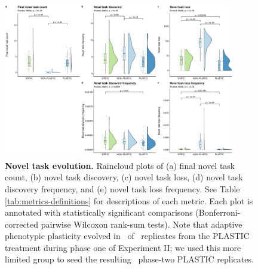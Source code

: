 \begin{figure}[h!]
    \centering
    \includegraphics[width=0.9\textwidth]{media/complex-traits-panel.pdf}
    \caption{\small
    \textbf{Novel task evolution.}
    Raincloud plots of 
    (a) final novel task count,
    (b) novel task discovery,
    (c) novel task loss,
    (d) novel task discovery frequency,
    and (e) novel task loss frequency.
    See Table \ref{tab:metrics-definitions} for descriptions of each metric.
    Each plot is annotated with statistically significant comparisons (Bonferroni-corrected pairwise Wilcoxon rank-sum tests).
    Note that adaptive phenotypic plasticity evolved in \novelTraitsPlasticReps\ of \novelTraitsReplicates\ replicates from the PLASTIC treatment during phase one of Experiment II; we used this more limited group to seed the resulting \novelTraitsPlasticReps\ phase-two PLASTIC replicates.
    }
    \label{fig:complex-traits}
\end{figure}